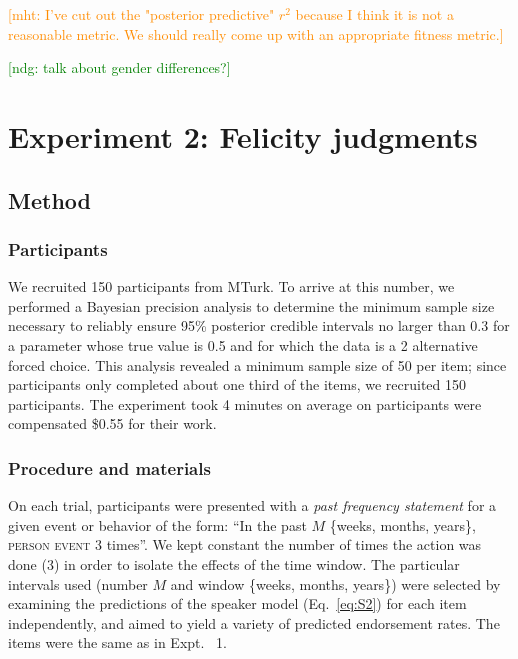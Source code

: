 \documentclass[10pt,letterpaper]{article}
\newcommand{\ndg}[1]{\textcolor{Green}{[ndg: #1]}}
\newcommand{\mht}[1]{\textcolor{DarkOrange}{[mht: #1]}}
\begin{document}
\mht{I've cut out the "posterior predictive" $r^2$ because I think it is not a reasonable metric. We should really come up with an appropriate fitness metric.}


\ndg{talk about gender differences?}

\section{Experiment 2: Felicity judgments}

\subsection{Method}

\subsubsection{Participants}

We recruited 150 participants from MTurk.
To arrive at this number, we performed a Bayesian precision analysis to determine the minimum sample size necessary to reliably ensure 95\% posterior credible intervals no larger than 0.3 for a parameter whose true value is 0.5 and for which the data is a 2 alternative forced choice. This analysis revealed a minimum sample size of 50 per item; since participants only completed about one third of the items, we recruited 150 participants.
The experiment took 4 minutes on average on participants were compensated \$0.55 for their work.

\subsubsection{Procedure and materials}

On each trial, participants were presented with a \emph{past frequency statement} for a given event or behavior of the form: ``In the past $M$ \{weeks, months, years\}, \textsc{person} \textsc{event} 3 times''.
We kept constant the number of times the action was done (3) in order to isolate the effects of the time window. 
The particular intervals used (number $M$ and window \{weeks, months, years\}) were selected by examining the predictions of the speaker model (Eq.~\ref{eq:S2}) for each item independently, and aimed to yield a variety of predicted endorsement rates.
The items were the same as in Expt. ~1.
\end{document}

